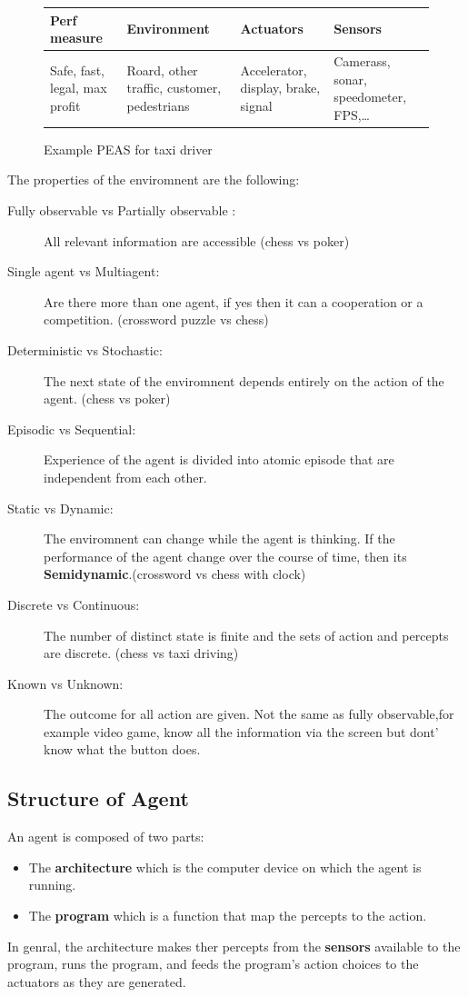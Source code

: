 \begin{figure}[h]
    \centering
    \begin{tabular}{|m{3cm}|m{3cm}|m{3cm}|m{3cm}|}
        \hline
        Perf measure & Environment & Actuators & Sensors \\
        \hline
        Safe, fast, legal, max profit  & Roard, other traffic, customer,
        pedestrians &  Accelerator, display,  brake, signal  & Camerass,
        sonar, speedometer, FPS,\ldots \\
        \hline

    \end{tabular}
    \caption{Example PEAS for taxi driver}
\end{figure}
The properties of the enviromnent are the following:
\begin{description}
\item[Fully observable vs Partially observable :] All relevant information are accessible (chess vs poker)
\item[Single agent vs Multiagent:] Are there more than one agent, if yes then it can a cooperation or a 
competition. (crossword puzzle vs chess)
\item[Deterministic vs Stochastic:] The next state of the enviromnent depends entirely on the action of the 
agent. (chess vs poker)
\item[Episodic vs Sequential:] Experience of the agent is divided into atomic episode that are independent 
from each other.
\item[Static vs Dynamic:] The enviromnent can change while the agent is thinking. If the performance of the 
agent change over the course of time, then its \textbf{Semidynamic}.(crossword vs chess with clock)
\item[Discrete vs Continuous:] The number of distinct state is finite and the sets of action and percepts are 
discrete. (chess vs taxi driving)
\item[Known vs Unknown:]  The outcome for all action are given. Not the same as fully observable,for 
example video game, know all the information via the screen but dont' know what the button does.

\end{description}

\subsection{Structure of Agent}
An agent is composed of two parts:
\begin{itemize}
\item The \textbf{architecture} which is the computer device on which the agent is running.
\item The \textbf{program} which is a function that map the percepts to the action. 
\end{itemize}
In genral, the architecture makes ther percepts from the \textbf{sensors} available to the program, runs the 
program, and feeds the program's action choices to the actuators as they are generated.

